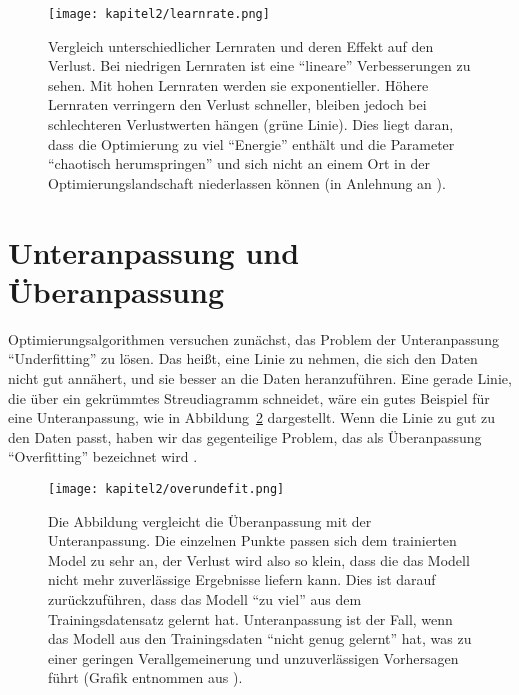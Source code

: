     \begin{figure}[H]
      \centering
      \texttt{[image: kapitel2/learnrate.png]}
      \caption[Einfluss der Lernrate auf den Verlust]{Vergleich unterschiedlicher Lernraten und deren Effekt auf den Verlust. Bei niedrigen Lernraten ist eine \enquote{lineare} Verbesserungen zu sehen. Mit hohen Lernraten werden sie exponentieller. Höhere Lernraten verringern den Verlust schneller, bleiben jedoch bei schlechteren Verlustwerten hängen (grüne Linie). Dies liegt daran, dass die Optimierung zu viel \enquote{Energie} enthält und die Parameter \enquote{chaotisch herumspringen} und sich nicht an einem Ort in der Optimierungslandschaft niederlassen können (in Anlehnung an \cite*{StanfordUniversityCoursecs231n2018}). }
      \label{Kap2:Lern}
    \end{figure}

    \section{Unteranpassung und Überanpassung}
    Optimierungsalgorithmen versuchen zunächst, das Problem der Unteranpassung \enquote{Underfitting} zu lösen. Das heißt, eine Linie zu nehmen, die sich den Daten nicht gut annähert, und sie besser an die Daten heranzuführen. Eine gerade Linie, die über ein gekrümmtes Streudiagramm schneidet, wäre ein gutes Beispiel für eine Unteranpassung, wie in Abbildung~\ref{Kap2:OverUnder} dargestellt. Wenn die Linie zu gut zu den Daten passt, haben wir das gegenteilige Problem, das als Überanpassung \enquote{Overfitting} bezeichnet wird \cite*[27]{Patterson2019}.

    \begin{figure}[H]
      \centering
      \texttt{[image: kapitel2/overundefit.png]}
      \caption[Vergleich der Unteranpassung mit der Überanpassung]{Die Abbildung vergleicht die Überanpassung mit der Unteranpassung. Die einzelnen Punkte passen sich dem trainierten Model zu sehr an, der Verlust wird also so klein, dass die das Modell nicht mehr zuverlässige Ergebnisse liefern kann. Dies ist darauf zurückzuführen, dass das Modell \enquote{zu viel} aus dem Trainingsdatensatz gelernt hat. Unteranpassung ist der Fall, wenn das Modell aus den Trainingsdaten \enquote{nicht genug gelernt} hat, was zu einer geringen Verallgemeinerung und unzuverlässigen Vorhersagen führt (Grafik entnommen aus \cite*[27]{Patterson2019}). }
      \label{Kap2:OverUnder}
    \end{figure}

